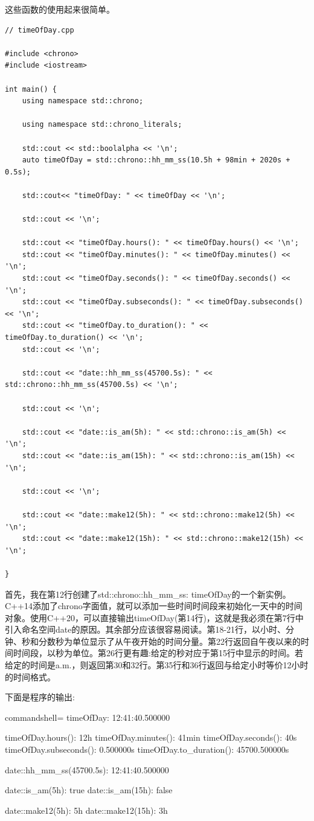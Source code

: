 这些函数的使用起来很简单。

\begin{lstlisting}[style=styleCXX]
// timeOfDay.cpp

#include <chrono>
#include <iostream>

int main() {
	using namespace std::chrono;    
	
	using namespace std::chrono_literals;
	
	std::cout << std::boolalpha << '\n';
	auto timeOfDay = std::chrono::hh_mm_ss(10.5h + 98min + 2020s + 0.5s);
	
	std::cout<< "timeOfDay: " << timeOfDay << '\n';
	
	std::cout << '\n';
	
	std::cout << "timeOfDay.hours(): " << timeOfDay.hours() << '\n';
	std::cout << "timeOfDay.minutes(): " << timeOfDay.minutes() << '\n';
	std::cout << "timeOfDay.seconds(): " << timeOfDay.seconds() << '\n';
	std::cout << "timeOfDay.subseconds(): " << timeOfDay.subseconds() << '\n';
	std::cout << "timeOfDay.to_duration(): " << timeOfDay.to_duration() << '\n';
	std::cout << '\n';
	
	std::cout << "date::hh_mm_ss(45700.5s): " << std::chrono::hh_mm_ss(45700.5s) << '\n';
	
	std::cout << '\n';
	
	std::cout << "date::is_am(5h): " << std::chrono::is_am(5h) << '\n';
	std::cout << "date::is_am(15h): " << std::chrono::is_am(15h) << '\n';
	
	std::cout << '\n';
	
	std::cout << "date::make12(5h): " << std::chrono::make12(5h) << '\n';
	std::cout << "date::make12(15h): " << std::chrono::make12(15h) << '\n';
	
}
\end{lstlisting}

首先，我在第12行创建了std::chrono::hh\_mm\_ss: timeOfDay的一个新实例。C++14添加了chrono字面值，就可以添加一些时间时间段来初始化一天中的时间对象。使用C++20，可以直接输出timeOfDay(第14行)，这就是我必须在第7行中引入命名空间date的原因。其余部分应该很容易阅读。第18-21行，以小时、分钟、秒和分数秒为单位显示了从午夜开始的时间分量。第22行返回自午夜以来的时间时间段，以秒为单位。第26行更有趣:给定的秒对应于第15行中显示的时间。若给定的时间是a.m.，则返回第30和32行。第35行和36行返回与给定小时等价12小时的时间格式。

下面是程序的输出:

\begin{tcblisting}{commandshell={}}
timeOfDay: 12:41:40.500000

timeOfDay.hours(): 12h
timeOfDay.minutes(): 41min
timeOfDay.seconds(): 40s
timeOfDay.subseconds(): 0.500000s
timeOfDay.to_duration(): 45700.500000s

date::hh_mm_ss(45700.5s): 12:41:40.500000

date::is_am(5h): true
date::is_am(15h): false

date::make12(5h): 5h
date::make12(15h): 3h
\end{tcblisting}

